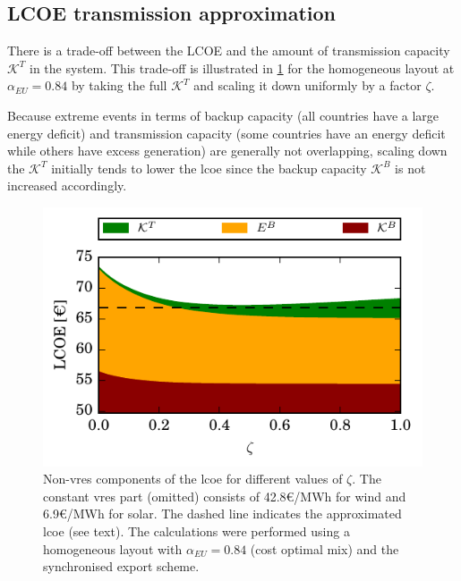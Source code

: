\documentclass[a4paper, 5p, sort&compress]{elsarticle}%
\begin{document}
\subsection{LCOE transmission approximation}
\label{sec:approximate-lcoe}

There is a trade-off between the LCOE and the amount of transmission
capacity $\mathcal{K}^{T}$ in the system. This trade-off is illustrated in
\cref{fig:transmission-lcoe} for the homogeneous layout at
$\alpha_{EU} = 0.84$ by taking the full $\mathcal{K}^{T}$ and scaling
it down uniformly by a factor $\zeta$.

Because extreme events in terms of backup capacity (all countries have
a large energy deficit) and transmission capacity (some countries have
an energy deficit while others have excess generation) are generally
not overlapping, scaling down the $\mathcal{K}^{T}$ initially tends to
lower the \gls{lcoe} since the backup capacity $\mathcal{K}^{B}$ is
not increased accordingly.


\begin{figure}[h!]
  \centering
  \includegraphics[width = \columnwidth]{constrainedSync-new}
  \caption{Non-\gls{vres} components of the \gls{lcoe} for different
    values of $\zeta$. The constant \gls{vres} part (omitted) consists of
    42.8\euro/MWh for wind and 6.9\euro/MWh for solar. The dashed line indicates the approximated
    \gls{lcoe} (see text). The calculations were performed using a
    homogeneous layout with $\alpha_{EU} = 0.84$ (cost optimal mix)
    and the synchronised export scheme.}
  \label{fig:transmission-lcoe}
\end{figure}
\end{document}

